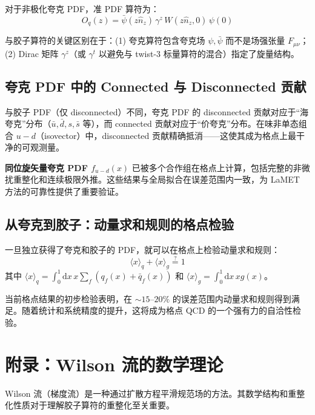 \documentclass[11pt,a4paper]{ctexart}
\begin{document}
对于非极化夸克 PDF，准 PDF 算符为：
\begin{equation}
O_q(z) = \bar{\psi}(z\hat{n}_z) \, \gamma^z \, W(z\hat{n}_z, 0) \, \psi(0)
\end{equation}

与胶子算符的关键区别在于：(1) 夸克算符包含夸克场 $\psi, \bar{\psi}$ 而不是场强张量 $F_{\mu\nu}$；(2) Dirac 矩阵 $\gamma^z$（或 $\gamma^t$ 以避免与 twist-3 标量算符的混合）指定了旋量结构。

\subsection{夸克 PDF 中的 Connected 与 Disconnected 贡献}

与胶子 PDF（仅 disconnected）不同，夸克 PDF 的 disconnected 贡献对应于``海夸克''分布（$\bar{u}, \bar{d}, s, \bar{s}$ 等），而 connected 贡献对应于``价夸克''分布。在味非单态组合 $u - d$（isovector）中，disconnected 贡献精确抵消——这使其成为格点上最干净的可观测量。

\textbf{同位旋矢量夸克 PDF $f_{u-d}(x)$} 已被多个合作组在格点上计算，包括完整的非微扰重整化和连续极限外推。这些结果与全局拟合在误差范围内一致，为 LaMET 方法的可靠性提供了重要验证。

\subsection{从夸克到胶子：动量求和规则的格点检验}

一旦独立获得了夸克和胶子的 PDF，就可以在格点上检验动量求和规则：
\begin{equation}
\langle x \rangle_q + \langle x \rangle_g \stackrel{?}{=} 1
\end{equation}
其中 $\langle x \rangle_q = \int_0^1 \mathrm{d}x \, x \sum_f (q_f(x) + \bar{q}_f(x))$ 和 $\langle x \rangle_g = \int_0^1 \mathrm{d}x \, x g(x)$。

当前格点结果的初步检验表明，在 $\sim 15\text{--}20\%$ 的误差范围内动量求和规则得到满足。随着统计和系统精度的提升，这将成为格点 QCD 的一个强有力的自洽性检验。

\section{附录：Wilson 流的数学理论}

Wilson 流（梯度流）是一种通过扩散方程平滑规范场的方法。其数学结构和重整化性质对于理解胶子算符的重整化至关重要。
\end{document}
